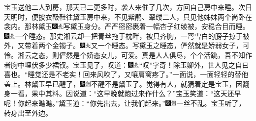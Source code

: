 宝玉送他二人到房，那天已二更多时，袭人来催了几次，方回自己房中来睡。次日天明时，便披衣靸鞋往黛玉房中来，不见紫鹃、翠缕二人，只见他姊妹两个尚卧在衾内。那林黛玉{\includegraphics[width=3mm]{../Images/00004}\includegraphics[width=3mm]{../Images/00012}\footnotesize \kaishu 写黛玉身分。}严严密密裹着一幅杏子红绫被，安稳合目而睡。{\includegraphics[width=3mm]{../Images/00004}\includegraphics[width=3mm]{../Images/00012}\footnotesize \kaishu 一个睡态。}那史湘云却一把青丝拖于枕畔，被只齐胸，一弯雪白的膀子掠于被外，又带着两个金镯子。{\includegraphics[width=3mm]{../Images/00004}\includegraphics[width=3mm]{../Images/00012}\footnotesize \kaishu 又一个睡态。写黛玉之睡态，俨然就是娇弱女子，可怜。湘云之态，则俨然是个娇态女儿，可爱。真是人人俱尽，个个活跳，吾不知作者胸中埋伏多少裙钗。}宝玉见了，叹道：{\includegraphics[width=3mm]{../Images/00004}\includegraphics[width=3mm]{../Images/00012}\footnotesize \kaishu “叹”字奇！除玉卿外，世人见之自曰喜也。}“睡觉还是不老实！回来风吹了，又嚷肩窝疼了。”一面说，一面轻轻的替他盖上。林黛玉早已醒了，{\includegraphics[width=3mm]{../Images/00004}\includegraphics[width=3mm]{../Images/00011}\footnotesize \kaishu 不醒不是黛玉了。}觉得有人，就猜着定是宝玉，因翻身一看，果中其料。因说道：“这早晚就跑过来作什么？”宝玉笑道：“这天还早呢！你起来瞧瞧。”黛玉道：“你先出去，让我们起来。”{\includegraphics[width=3mm]{../Images/00004}\includegraphics[width=3mm]{../Images/00011}\footnotesize \kaishu 一丝不乱。}宝玉听了，转身出至外边。

